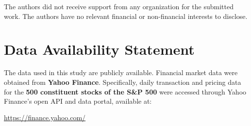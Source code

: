 \documentclass[10pt,leqno]{amsart}
\begin{document}
The authors did not receive support from any organization for the submitted work. The authors have no relevant financial or non-financial interests to disclose.  



\section*{Data Availability Statement}
The data used in this study are publicly available. Financial market data were obtained from \textbf{Yahoo Finance}. Specifically, daily transaction and pricing data for the \textbf{500 constituent stocks of the S\&P 500} were accessed through Yahoo Finance’s open API and data portal, available at:

\noindent\url{https://finance.yahoo.com/}
\end{document}

